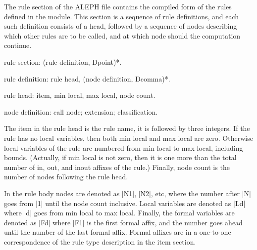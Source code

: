 \documentclass[titlepage]{article}
\newcommand\A{\textsf{ALEPH}}
\newcommand\g[1]{\textsf{#1}}
\newenvironment{grammar}{%
\begin{list}{}{%
\setlength\leftmargin{18pt}%
\setlength\rightmargin{-5pt}%
\setlength\listparindent{20pt}%
\setlength\itemsep{1pt plus0.2ex}%
\setlength\parsep{0pt plus 2pt}%
\setlength\labelsep{-5pt}%
}\sf\mkoptions%
}{\end{list}}
\begin{document}
The \g{rule section} of the \A{} file contains the compiled form of the
rules defined in the module. This section is a sequence of \g{rule
definition}s, and each such definition consists of a head, followed by a 
sequence of \g{node}s describing which other rules are to be called, and at
which node should the computation continue.
\begin{grammar}
\item rule section: (rule definition, Dpoint)*.
\item rule definition: rule head, (node definition, Dcomma)*.
\item rule head: item, min local, max local, node count.
\item node definition: call node; extension; classification.
\end{grammar}
The \g{item} in the \g{rule head} is the rule name, it is followed by three
integers. If the rule has no local
variables, then both \g{min local} and \g{max local} are zero. Otherwise
local variables of the rule
are numbered from \g{min local} to \g{max local}, including bounds.
(Actually, if \g{min local} is not zero, then it is one more than the total
number of in, out, and inout affixes of the rule.) Finally, \g{node count} 
is the number of nodes following the rule head. 

In the rule body nodes are denoted as \pp|N1|, \pp|N2|, etc, where the
number after \pp|N| goes from \pp|1| until the node count inclusive. Local
variables are denoted as \pp|Ld| where \pp|d| goes from \g{min local} to
\g{max local}. Finally, the formal variables are denoted as \pp|Fd| where
\pp|F1| is the first formal affix, and the number goes ahead until the
number of the last formal affix. Formal affixes are in a one-to-one
correspondence of the rule type description in the \g{item section}.
\end{document}
